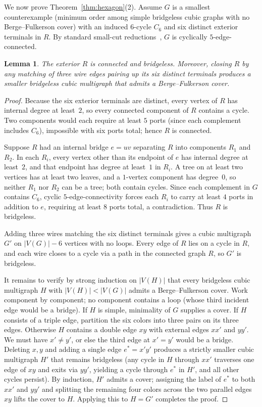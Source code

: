 \documentclass[11pt]{article}
\newtheorem{lemma}[theorem]{Lemma}
\begin{document}
We now prove Theorem~\ref{thm:hexagon}(2). Assume $G$ is a smallest counterexample
(minimum order among simple bridgeless cubic graphs with no Berge--Fulkerson cover) with
an induced $6$-cycle $C_6$ and six distinct exterior terminals in $R$. By standard
small-cut reductions~\cite{MMT}, $G$ is cyclically $5$-edge-connected.

\begin{lemma}\label{lem:wire-bridgeless}
The exterior $R$ is connected and bridgeless. Moreover, closing $R$ by any matching of
three wire edges pairing up its six distinct terminals produces a smaller bridgeless
cubic multigraph that admits a Berge--Fulkerson cover.
\end{lemma}

\begin{proof}
Because the six exterior terminals are distinct, every vertex of $R$ has internal degree
at least~$2$, so every connected component of $R$ contains a cycle. Two components would
each require at least $5$ ports (since each complement includes $C_6$), impossible with
six ports total; hence $R$ is connected.

Suppose $R$ had an internal bridge $e = uv$ separating $R$ into components $R_1$ and
$R_2$. In each $R_i$, every vertex other than its endpoint of $e$ has internal degree at
least~$2$, and that endpoint has degree at least~$1$ in $R_i$. A tree on at least two
vertices has at least two leaves, and a $1$-vertex component has degree~$0$, so neither
$R_1$ nor $R_2$ can be a tree; both contain cycles. Since each complement in $G$ contains
$C_6$, cyclic $5$-edge-connectivity forces each $R_i$ to carry at least $4$ ports in
addition to $e$, requiring at least $8$ ports total, a contradiction. Thus $R$ is
bridgeless.

Adding three wires matching the six distinct terminals gives a cubic multigraph $G'$ on
$|V(G)| - 6$ vertices with no loops. Every edge of $R$ lies on a cycle in $R$, and each
wire closes to a cycle via a path in the connected graph $R$, so $G'$ is bridgeless.

It remains to verify by strong induction on $|V(H)|$ that every bridgeless cubic
multigraph $H$ with $|V(H)| < |V(G)|$ admits a Berge--Fulkerson cover. Work component by
component; no component contains a loop (whose third incident edge would be a bridge). If
$H$ is simple, minimality of $G$ supplies a cover. If $H$ consists of a triple edge,
partition the six colors into three pairs on its three edges. Otherwise $H$ contains a
double edge $xy$ with external edges $xx'$ and $yy'$. We must have $x' \neq y'$, or else
the third edge at $x' = y'$ would be a bridge. Deleting $x, y$ and adding a single edge
$e^* = x'y'$ produces a strictly smaller cubic multigraph $H'$ that remains bridgeless
(any cycle in $H$ through $xx'$ traverses one edge of $xy$ and exits via $yy'$, yielding
a cycle through $e^*$ in $H'$, and all other cycles persist). By induction, $H'$ admits a
cover; assigning the label of $e^*$ to both $xx'$ and $yy'$ and splitting the remaining
four colors across the two parallel edges $xy$ lifts the cover to $H$. Applying this to
$H = G'$ completes the proof.
\end{proof}
\end{document}
